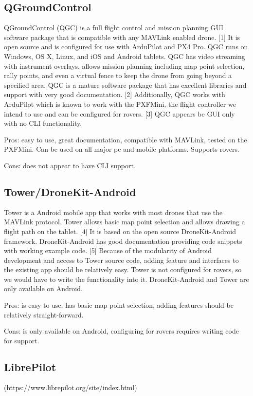 \documentclass[compsoc,draftclsnofoot,onecolumn,10pt]{IEEEtran}
\begin{document}
\subsection{QGroundControl}

QGroundControl (QGC) is a full flight control and mission planning GUI software
package that is compatible with any MAVLink enabled drone. [1] It is open source and
is configured for use with ArduPilot and PX4 Pro. QGC runs on Windows, OS X,
Linux, and iOS and Android tablets. QGC has video streaming with instrument
overlays, allows mission planning including map point selection, rally points,
and even a virtual fence to keep the drone from going beyond a specified area.
QGC is a mature software package that has excellent libraries and support with
very good documentation. [2]
Additionally, QGC works with ArduPilot which is known to work with the PXFMini,
the flight controller we intend to use and can be configured for rovers. [3] QGC 
appears be GUI only with no CLI functionality.

Pros: easy to use, great documentation, compatible with MAVLink, tested on the
PXFMini. Can be used on all major pc and mobile platforms. Supports rovers.

Cons: does not appear to have CLI support.

\subsection{Tower/DroneKit-Android}
Tower is a Android mobile app that works with most drones that use the MAVLink
protocol. Tower allows basic map point selection and allows drawing a flight
path on the tablet. [4] It is based on the open source DroneKit-Android framework.
DroneKit-Android has good documentation providing code snippets with working
example code. [5] Because of the modularity of Android development and access to
Tower source code, adding feature and interfaces to the existing app should be
relatively easy. Tower is not configured for rovers, so we would have to write
the functionality into it. DroneKit-Android and Tower are only available on Android. 

Pros: is easy to use, has basic map point selection, adding features should be
relatively straight-forward.

Cons: is only available on Android, configuring for rovers requires writing code
for support.

\subsection{LibrePilot}
(https://www.librepilot.org/site/index.html)  
\end{document}
